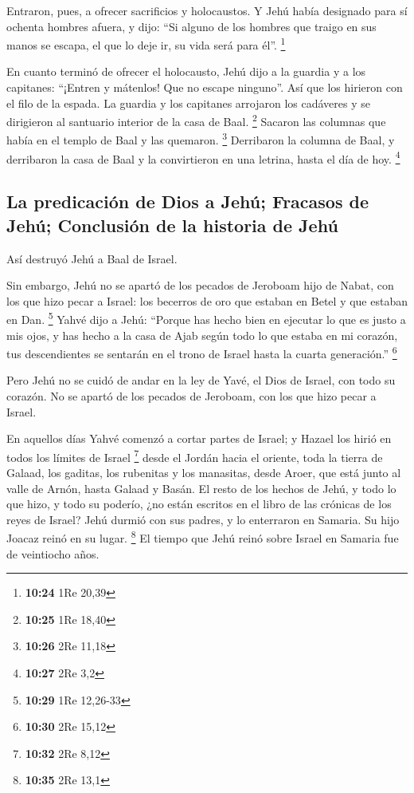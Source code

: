 \begin{paracol}{2}
 Entraron, pues, a ofrecer sacrificios y holocaustos. Y
Jehú había designado para sí ochenta hombres afuera, y dijo: ``Si alguno
de los hombres que traigo en sus manos se escapa, el que lo deje ir, su
vida será para él''. \footnote{\textbf{10:24} 1Re 20,39}

 En cuanto terminó de ofrecer el holocausto, Jehú dijo a
la guardia y a los capitanes: ``¡Entren y mátenlos! Que no escape
ninguno''. Así que los hirieron con el filo de la espada. La guardia y
los capitanes arrojaron los cadáveres y se dirigieron al santuario
interior de la casa de Baal. \footnote{\textbf{10:25} 1Re 18,40}
 Sacaron las columnas que había en el templo de Baal y
las quemaron. \footnote{\textbf{10:26} 2Re 11,18} 
Derribaron la columna de Baal, y derribaron la casa de Baal y la
convirtieron en una letrina, hasta el día de hoy. \footnote{\textbf{10:27}
  2Re 3,2}

\hypertarget{la-predicaciuxf3n-de-dios-a-jehuxfa-fracasos-de-jehuxfa-conclusiuxf3n-de-la-historia-de-jehuxfa}{%
\subsection{La predicación de Dios a Jehú; Fracasos de Jehú; Conclusión
de la historia de
Jehú}\label{la-predicaciuxf3n-de-dios-a-jehuxfa-fracasos-de-jehuxfa-conclusiuxf3n-de-la-historia-de-jehuxfa}}

 Así destruyó Jehú a Baal de Israel.

 Sin embargo, Jehú no se apartó de los pecados de
Jeroboam hijo de Nabat, con los que hizo pecar a Israel: los becerros de
oro que estaban en Betel y que estaban en Dan. \footnote{\textbf{10:29}
  1Re 12,26-33}  Yahvé dijo a Jehú: ``Porque has hecho
bien en ejecutar lo que es justo a mis ojos, y has hecho a la casa de
Ajab según todo lo que estaba en mi corazón, tus descendientes se
sentarán en el trono de Israel hasta la cuarta generación.'' \footnote{\textbf{10:30}
  2Re 15,12}

 Pero Jehú no se cuidó de andar en la ley de Yavé, el
Dios de Israel, con todo su corazón. No se apartó de los pecados de
Jeroboam, con los que hizo pecar a Israel.

 En aquellos días Yahvé comenzó a cortar partes de
Israel; y Hazael los hirió en todos los límites de Israel \footnote{\textbf{10:32}
  2Re 8,12}  desde el Jordán hacia el oriente, toda la
tierra de Galaad, los gaditas, los rubenitas y los manasitas, desde
Aroer, que está junto al valle de Arnón, hasta Galaad y Basán.
 El resto de los hechos de Jehú, y todo lo que hizo, y
todo su poderío, ¿no están escritos en el libro de las crónicas de los
reyes de Israel?  Jehú durmió con sus padres, y lo
enterraron en Samaria. Su hijo Joacaz reinó en su lugar. \footnote{\textbf{10:35}
  2Re 13,1}  El tiempo que Jehú reinó sobre Israel en
Samaria fue de veintiocho años.


\end{paracol}
